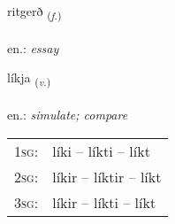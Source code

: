 \documentclass[frontgrid, backgrid]{flacards}\usepackage[]{graphicx}\usepackage[]{xcolor}
\begin{document}
\renewcommand{\flhead}{\vskip5pt \fboxsep=0pt {\small\bfseries\footnotesize Nafnorð | Noun}}
\renewcommand{\fcfoot}{\vskip5pt \fboxsep=0pt \hspace{2pt}{\small\bfseries\footnotesize 2K}}

\renewcommand{\blhead}{\vskip5pt {\small\bfseries\footnotesize Nafnorð | Noun }}
\renewcommand{\bcfoot}{\vskip5pt \hspace{2pt}{\small\bfseries\footnotesize 2K}}


{ritgerð \small{\textsubscript{(\textit{f.})}} \\[1ex] %
\textphonetic{[rɪːtcɛrð]} \\
en.: \emph{essay} \\  [2ex]
\renewcommand*{\arraystretch}{0.8}
}

\renewcommand{\flhead}{\vskip5pt \fboxsep=0pt {\small\bfseries\footnotesize Sagnorð | Verb}}
\renewcommand{\fcfoot}{\vskip5pt \fboxsep=0pt \hspace{2pt}{\small\bfseries\footnotesize 2K}}

\renewcommand{\blhead}{\vskip5pt {\small\bfseries\footnotesize Sagnorð | Verb }}
\renewcommand{\bcfoot}{\vskip5pt \hspace{2pt}{\small\bfseries\footnotesize 2K}}


{líkja \small{\textsubscript{(\textit{v.})}} \\[1ex] %
\textphonetic{[liːca]} \\
en.: \emph{simulate; compare} \\  [2ex]
\renewcommand*{\arraystretch}{0.8}
\begin{tabular}{p{1cm}l}
\textsc{1sg}: & líki -- líkti -- líkt \\ 
\textsc{2sg}: & líkir -- líktir -- líkt \\ 
\textsc{3sg}: & líkir -- líkti -- líkt \\ 
\end{tabular}
}
\end{document}
